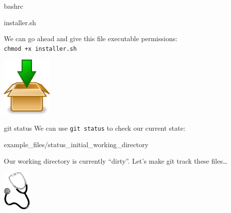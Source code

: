 \documentclass[aspectratio=43]{beamer}
\begin{document}
\begin{frame}[fragile]{bashrc}
    
\end{frame}

\begin{frame}[fragile]{installer.sh}
    

    We can go ahead and give this file executable permissions:\\
    \texttt{chmod +x installer.sh}

    \begin{flushright}
        \includegraphics[height=3cm]{resources/installer.png}
    \end{flushright}
\end{frame}

\begin{frame}[fragile]{git status}
    We can use \texttt{git status} to check our current state:

    
                    {example_files/status_initial_working_directory}

    Our working directory is currently ``dirty''. Let's make git track these
    files\ldots
    
    \begin{flushright}
        \includegraphics[height=2cm]{resources/stethoscope.pdf}
    \end{flushright}
\end{frame}
\end{document}
